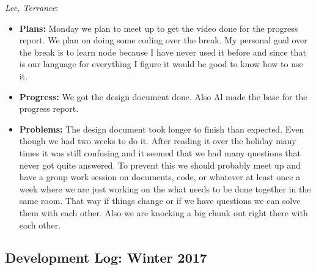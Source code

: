 \documentclass[10pt,draftclsnofoot,onecolumn]{IEEEtran}
\newcommand{\subsubsubsection}[1]{
	\hfill\break\textit{#1}:
}
\begin{document}
\subsubsubsection{Lee, Terrance}
\begin{itemize}
	\item \textbf{Plans: }Monday we plan to meet up to get the video done for the progress report.
	We plan on doing some coding over the break. My personal goal over the break is to learn node because I have never used it before and since that is our language for everything I figure it would be good to know how to use it.
	\item \textbf{Progress: }We got the design document done. Also Al made the base for the progress report.
	\item \textbf{Problems: }The design document took longer to finish than expected. Even though we had two weeks to do it. After reading it over the holiday many times it was still confusing and it seemed that we had many questions that never got quite answered. To prevent this we should probably meet up and have a group work session on documents, code, or whatever at least once a week where we are just working on the what needs to be done together in the same room. That way if things change or if we have questions we can solve them with each other. Also we are knocking a big chunk out right there with each other.
\end{itemize}

\subsection{Development Log: Winter 2017}
\end{document}
